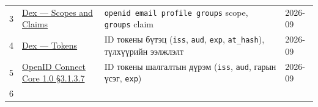 \begin{longtable}[]{@{}llll@{}}
\begin{minipage}[t]{0.22\columnwidth}
3\strut
\end{minipage} & \begin{minipage}[t]{0.22\columnwidth}\raggedright
\href{https://dexidp.io/docs/configuration/custom-scopes-claims-clients/}{Dex --- Scopes and Claims}\strut
\end{minipage} & \begin{minipage}[t]{0.22\columnwidth}\raggedright
\texttt{openid\ email\ profile\ groups} scope, \texttt{groups} claim\strut
\end{minipage} & \begin{minipage}[t]{0.22\columnwidth}\raggedright
2026-09\strut
\end{minipage}\tabularnewline
\begin{minipage}[t]{0.22\columnwidth}\raggedright
4\strut
\end{minipage} & \begin{minipage}[t]{0.22\columnwidth}\raggedright
\href{https://dexidp.io/docs/configuration/tokens/}{Dex --- Tokens}\strut
\end{minipage} & \begin{minipage}[t]{0.22\columnwidth}\raggedright
ID токены бүтэц (\texttt{iss}, \texttt{aud}, \texttt{exp}, \texttt{at\_hash}), түлхүүрийн ээлжлэлт\strut
\end{minipage} & \begin{minipage}[t]{0.22\columnwidth}\raggedright
2026-09\strut
\end{minipage}\tabularnewline
\begin{minipage}[t]{0.22\columnwidth}\raggedright
5\strut
\end{minipage} & \begin{minipage}[t]{0.22\columnwidth}\raggedright
\href{https://openid.net/specs/openid-connect-core-1_0.html}{OpenID Connect Core 1.\allowbreak{}0 §3.\allowbreak{}1.\allowbreak{}3.\allowbreak{}7}\strut
\end{minipage} & \begin{minipage}[t]{0.22\columnwidth}\raggedright
ID токены шалгалтын дүрэм (\texttt{iss}, \texttt{aud}, гарын үсэг, \texttt{exp})\strut
\end{minipage} & \begin{minipage}[t]{0.22\columnwidth}\raggedright
2026-09\strut
\end{minipage}\tabularnewline
\begin{minipage}[t]{0.22\columnwidth}\raggedright
6\strut
\end{minipage} & \begin{minipage}[t]{0.22\columnwidth}\raggedright

\end{minipage}
\end{longtable}
